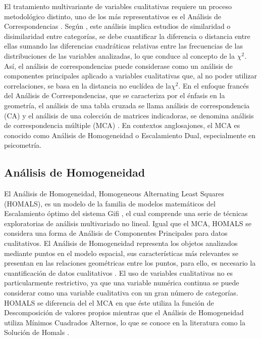 \documentclass[water,article,submit,moreauthors,pdftex]{mdpi}
\begin{document}
El tratamiento multivariante de variables cualitativas requiere un
proceso metodológico distinto, uno de los más representativos es el
Análisis de Correspondencias \citep{Benzecri}. Según \citep{perez2004},
este análisis implica estudios de similaridad o disimilaridad entre
categorías, se debe cuantificar la diferencia o distancia entre ellas
sumando las diferencias cuadráticas relativas entre las frecuencias de
las distribuciones de las variables analizadas, lo que conduce al
concepto de la \(\chi^2\). Así, el análisis de correspondencias puede
considerase como un análisis de componentes principales aplicado a
variables cualitativas que, al no poder utilizar correlaciones, se basa
en la distancia no euclídea de la\(\chi^2\). En el enfoque francés del
Análisis de Correspondencias, que se caracteriza por el énfasis en la
geometría, el análisis de una tabla cruzada se llama análisis de
correspondencia (CA) y el análisis de una colección de matrices
indicadoras, se denomina análisis de correspondencia múltiple (MCA)
\citep{michailidis1998}. En contextos anglosajones, el MCA es conocido
como Análisis de Homogeneidad o Escalamiento Dual, especialmente en
psicometría.

\hypertarget{anuxe1lisis-de-homogeneidad}{%
\subsection{Análisis de
Homogeneidad}\label{anuxe1lisis-de-homogeneidad}}

El Análisis de Homogeneidad, Homogeneous Alternating Least Squares
(HOMALS), es un modelo de la familia de modelos matemáticos del
Escalamiento óptimo del sistema Gifi \citep{Gifi1990}, el cual comprende
una serie de técnicas exploratorias de análisis multivariado no lineal.
Igual que el MCA, HOMALS se considera una forma de Análisis de
Componentes Principales para datos cualitativos. El Análisis de
Homogeneidad representa los objetos analizados mediante puntos en el
modelo espacial, sus características más relevantes se presentan en las
relaciones geométricas entre los puntos, para ello, es necesario la
cuantificación de datos cualitativos \citep{Lopez2014}. El uso de
variables cualitativas no es particularmente restrictivo, ya que una
variable numérica continua se puede considerar como una variable
cualitativa con un gran número de categorías. HOMALS se diferencia del
el MCA en que éste utiliza la función de Descomposición de valores
propios mientras que el Análisis de Homogeneidad utiliza Mínimos
Cuadrados Alternos, lo que se conoce en la literatura como la Solución
de Homals \citep{michailidis1998}.
\end{document}
